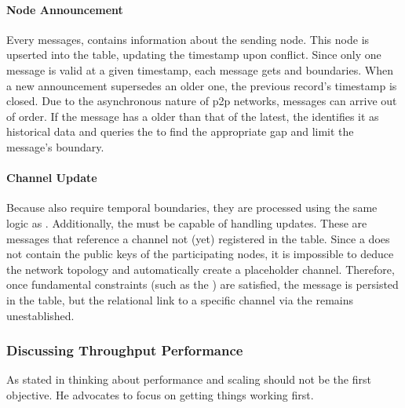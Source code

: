 \paragraph{Node Announcement}
Every  messages, contains information about the sending node.
This node is upserted into the  table, 
updating the  timestamp upon conflict.
Since only one  message is valid at a given timestamp, 
each message gets  and  boundaries.
When a new announcement supersedes an older one, 
the previous record's  timestamp is closed.
Due to the asynchronous nature of \gls{p2p} networks, messages can arrive out of order. 
If the  message has a  older than that of the latest,
the  identifies it as historical data and queries the 
to find the appropriate gap and limit the message's  boundary.

\paragraph{Channel Update}
Because  also require temporal boundaries, 
they are processed using the same logic as . 
Additionally, the  must be capable of handling  updates. 
These are  messages that reference a channel not (yet) registered in the  table. 
Since a  does not contain the public keys of the participating nodes, 
it is impossible to deduce the network topology and automatically create a placeholder channel. 
Therefore, once fundamental constraints (such as the ) are satisfied, 
the message is persisted in the  table, but the relational 
link to a specific channel via the  remains unestablished.

\subsubsection{Discussing Throughput Performance}

As stated in  thinking about performance and scaling should not be the first objective.
He advocates to focus on getting things working first.~\cite[Chapter~1]{kleppmann_designing_2017}


